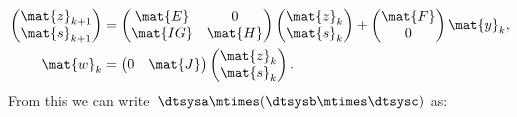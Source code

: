 \begin{equation*}
    \label{eq:dlin-6}
    \begin{aligned}
        \begin{pmatrix}
            \mat{z}_{k+1} \\
            \mat{s}_{k+1}
        \end{pmatrix}&=
        \begin{pmatrix}
            \mat{E}  & 0       \\
            \mat{IG} & \mat{H}
        \end{pmatrix}\begin{pmatrix}
                         \mat{z}_k\\ \mat{s}_k
        \end{pmatrix}+
        \begin{pmatrix}
            \mat{F}\\ 0
        \end{pmatrix}\mat{y}_k,\\
        \mat{w}_k&=\begin{pmatrix}
                       0& \mat{J}
        \end{pmatrix}\begin{pmatrix}
                         \mat{z}_k\\ \mat{s}_k
        \end{pmatrix}.
    \end{aligned}
\end{equation*}
From this we can write~$\dtsysa\mtimes (\dtsysb\mtimes \dtsysc)$ as:
